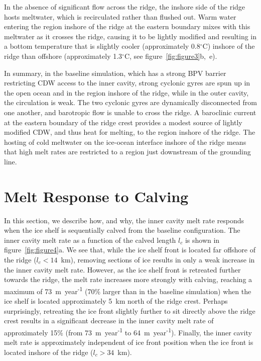 \documentclass[draft]{agujournal2019}
\begin{document}
In the absence of significant flow across the ridge, the inshore side of the ridge hosts meltwater, which is recirculated rather than flushed out. Warm water entering the region inshore of the ridge at the eastern boundary mixes with this meltwater as it crosses the ridge, causing it to be lightly modified and resulting in a bottom temperature that is slightly cooler (approximately 0.8${}^\circ$C) inshore of the ridge than offshore (approximately 1.3${}^\circ$C, see figure~\ref{fig:figure3}b,~e).


In summary, in the baseline simulation, which has a strong BPV barrier restricting CDW access to the inner cavity, strong cyclonic gyres are spun up in the open ocean and in the region inshore of the ridge, while in the outer cavity, the circulation is weak. The two cyclonic gyres are dynamically disconnected from one another, and barotropic flow is unable to cross the ridge. A baroclinic current at the eastern boundary of the ridge crest provides a modest source of lightly modified CDW, and thus heat for melting, to the region inshore of the ridge. The hosting of cold meltwater on the ice-ocean interface inshore of the ridge means that high melt rates are restricted to a region just downstream of the grounding line. 

\section{Melt Response to Calving}\label{S:Results:lc}
In this section, we describe how, and why, the inner cavity melt rate responds when the ice shelf is sequentially calved from the baseline configuration. The inner cavity melt rate as a function of the calved length $l_c$ is shown in figure~\ref{fig:figure4}a. We see that, while the ice shelf front is located far offshore of the ridge ($l_c< 14$~km), removing sections of ice results in only a weak increase in the inner cavity melt rate. However, as the ice shelf front is retreated further towards the ridge, the melt rate increases more strongly with calving, reaching a maximum of 73~m~year\textsuperscript{-1} (70\% larger than in the baseline simulation) when the ice shelf is located approximately 5~km north of the ridge crest. Perhaps surprisingly, retreating the ice front slightly further to sit directly above the ridge crest results in a significant decrease in the inner cavity melt rate of approximately 15\% (from 73~m~year\textsuperscript{-1} to 64~m~year\textsuperscript{-1}). Finally, the inner cavity melt rate is approximately independent of ice front position when the ice front is located inshore of the ridge ($l_c>34$~km).
\end{document}
